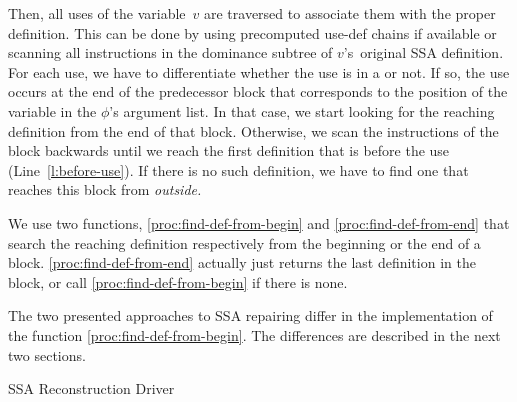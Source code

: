 {Then, all uses of the variable~$v$ are traversed to associate them with the proper definition.
This can be done by using precomputed use-def chains if available or scanning all instructions in the dominance subtree of $v$'s~original SSA definition.
For each use, we have to differentiate whether the use is in a \phifun or not.
If so, the use occurs at the end of the predecessor block that corresponds to the position of the variable in the $\phi$'s argument list.
In that case, we start looking for the reaching definition from the end of that block.
Otherwise, we scan the instructions of  the block backwards until we reach the first definition that is before the use (Line~\ref{l:before-use}).
If there is no such definition, we have to find one that reaches this block from \emph{outside.}

We use two functions, \ref{proc:find-def-from-begin} and \ref{proc:find-def-from-end} that search the reaching definition respectively from the beginning or the end of a block.
\ref{proc:find-def-from-end} actually just returns the last definition in the block, or call \ref{proc:find-def-from-begin} if there is none.

The two presented approaches to SSA repairing differ in the implementation of the function \ref{proc:find-def-from-begin}.
The differences are described in the next two sections.

\begin{algorithm}
	\caption{SSA Reconstruction Driver}
	\label{alg:ssaconstr_driver}

\end{algorithm}

}
